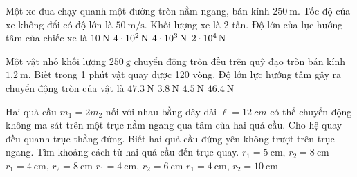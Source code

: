 \begin{ex}
	Một xe đua chạy quanh một đường tròn nằm ngang, bán kính $\SI{250}{\meter}$. Tốc độ của xe không đổi có độ lớn là $\SI{50}{\meter/\second}$. Khối lượng xe là 2 tấn. Độ lớn của lực hướng tâm của chiếc xe là
	\choice
	{$\SI{10}{\newton}$}
	{$\SI{4E2}{\newton}$}
	{$\SI{4E3}{\newton}$}
	{\True $\SI{2E4}{\newton}$}
\end{ex}
\begin{ex}
Một vật nhỏ khối lượng $\SI{250}{\gram}$ chuyển động tròn đều trên quỹ đạo tròn bán kính $\SI{1.2}{\meter}$. Biết trong 1 phút vật quay được 120 vòng. Độ lớn lực hướng tâm gây ra chuyển động tròn của vật là	
	\choice
	{\True $\SI{47.3}{\newton}$}
	{$\SI{3.8}{\newton}$}
	{$\SI{4.5}{\newton}$}
	{$\SI{46.4}{\newton}$}
\end{ex}
\begin{ex}
Hai quả cầu $m_1=2m_2$ nối với nhau bằng dây dài $\ell=\SI{12}{cm}$ có thể chuyển động không ma sát trên một trục nằm ngang qua tâm của hai quả cầu. Cho hệ quay đều quanh trục thẳng đứng. Biết hai quả cầu đứng yên không trượt trên trục ngang. Tìm khoảng cách từ hai quả cầu đến trục quay.	
	\choice
	{$r_1=\SI{5}{\centi\meter}$, $r_2=\SI{8}{\centi\meter}$}
	{\True $r_1=\SI{4}{\centi\meter}$, $r_2=\SI{8}{\centi\meter}$}
	{$r_1=\SI{4}{\centi\meter}$, $r_2=\SI{6}{\centi\meter}$}
	{$r_1=\SI{4}{\centi\meter}$, $r_2=\SI{10}{\centi\meter}$}
\end{ex}
